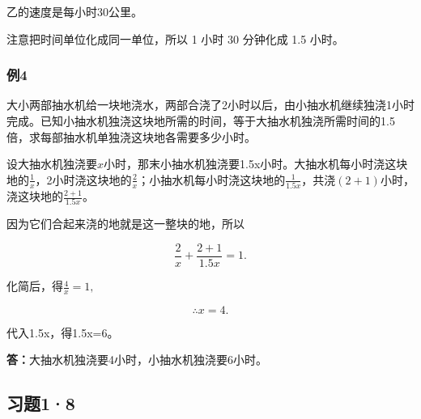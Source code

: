 乙的速度是每小时30公里。


注意把时间单位化成同一单位，所以 1 小时 30 分钟化成 1.5 小时。

\subsubsection{例4}

大小两部抽水机给一块地浇水，两部合浇了2小时以后，由小抽水机继续独浇1小时完成。已知小抽水机独浇这块地所需的时间，等于大抽水机独浇所需时间的1.5倍，求每部抽水机单独浇这块地各需要多少小时。


设大抽水机独浇要\(x\)小时，那末小抽水机独浇要1.5x小时。大抽水机每小时浇这块地的\(\frac{1}{x}\)，2小时浇这块地的\(\frac{2}{x}\)；小抽水机每小时浇这块地的\(\frac{1}{1.5x}\)，共浇\((2 + 1)\)小时，浇这块地的\(\frac{2 + 1}{1.5x}\)。

因为它们合起来浇的地就是这一整块的地，所以

\[
\frac{2}{x} + \frac{2 + 1}{1.5 x} = 1.
\]

化简后，得\(\frac{4}{x} = 1,\)

\[
\therefore x = 4.
\]

代入1.5x，得1.5x=6。

\textbf{答：}大抽水机独浇要4小时，小抽水机独浇要6小时。

\subsection{习题1·8}

